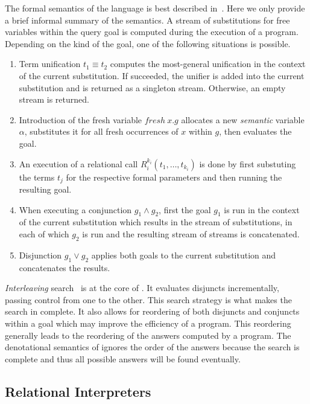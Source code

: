 The formal semantics of the language is best described in~\cite{rozplokhas2020certified}.
Here we only provide a brief informal summary of the semantics.
A stream of substitutions for free variables within the query goal is computed during the execution of a \mk program.
Depending on the kind of the goal, one of the following situations is possible.

\begin{enumerate}
  \item Term unification $t_1 \equiv t_2$ computes the most-general unification in the context of the current substitution. If succeeded, the unifier is added into the current substitution and is returned as a singleton stream. Otherwise, an empty stream is returned.
  \item Introduction of the fresh variable $fresh \ x. g$ allocates a new \emph{semantic} variable $\alpha$, substitutes it for all fresh occurrences of $x$ within $g$, then evaluates the goal.
  \item An execution of a relational call $R^{k_i}_i(t_1, \dots, t_{k_i})$ is done by first substuting the terms $t_j$ for the respective formal parameters and then running the resulting goal.
  \item When executing a conjunction $g_1 \wedge g_2$, first the goal $g_1$ is run in the context of the current substitution which results in the stream of substitutions, in each of which $g_2$ is run and the resulting stream of streams is concatenated.
  \item Disjunction $g_1 \vee g_2$ applies both goals to the current substitution and concatenates the results.
\end{enumerate}

\emph{Interleaving} search~\cite{10.1145/1090189.1086390} is at the core of \mk.
It evaluates disjuncts incrementally, passing control from one to the other.
This search strategy is what makes the search in \mk complete.
It also allows for reordering of both disjuncts and conjuncts within a goal which may improve the efficiency of a program.
This reordering generally leads to the reordering of the answers computed by a \mk program.
The denotational semantics of \mk ignores the order of the answers because the search is complete and thus all possible answers will be found eventually.

\subsection{Relational Interpreters}

